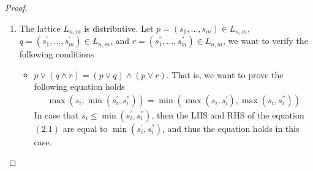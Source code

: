 \begin{proof}
\begin{enumerate}[label=(\alph*)]
\begin{itemize}
\begin{align*}
            p \wedge q = \left( \min(s_{i}, s_{i}^{'}) \right)_{i=1,\ldots,m}
          \end{align*}
        \item The smallest element $r = (s_{1}^{''}, \ldots, s_{m}^{''}) \in L_{n,m}$ such that $r \geq p,q$ is unique. It is obvious that $r$ is the smallest element in $L_{n,m}$ such that $r \geq p,q$ when $s_{i}^{''} = \max(s_{i},s_{i}^{'})$, and such $r$ is unique. That is, $p \vee q = r$, and
          \begin{align*}
            p \vee q = \left( \max(s_{i}, s_{i}^{'}) \right)_{i=1,\ldots,m}
          \end{align*}
      \end{itemize}
      Therefore, the partial order $(L_{n,m}, \leq)$ is a lattice.
    \item The lattice $L_{n,m}$ is distributive. Let $p = (s_{1}, \ldots, s_{m}) \in L_{n,m}$, $q = (s_{1}^{'}, \ldots, s_{m}^{'}) \in L_{n,m}$, and $r = (s_{1}^{''}, \ldots, s_{m}^{''}) \in L_{n,m}$, we want to verify the following conditions
      \begin{itemize}
        \item $p \vee (q \wedge r) = (p \vee q) \wedge (p \vee r)$. That is, we want to prove the following equation holds
          \begin{align*}
            \max(s_{i}, \min(s_{i}^{'}, s_{i}^{''})) = \min(\max(s_{i},s_{i}^{'}), \max(s_{i},s_{i}^{''})) \tag{2.1}
          \end{align*}
          In case that $s_{i} \leq \min(s_{i}^{'}, s_{i}^{''})$, then the LHS and RHS of the equation $(2.1)$ are equal to $\min(s_{i}^{'}, s_{i}^{''})$, and thus the equation holds in this case. 


\end{itemize}
\end{enumerate}
\end{proof}
